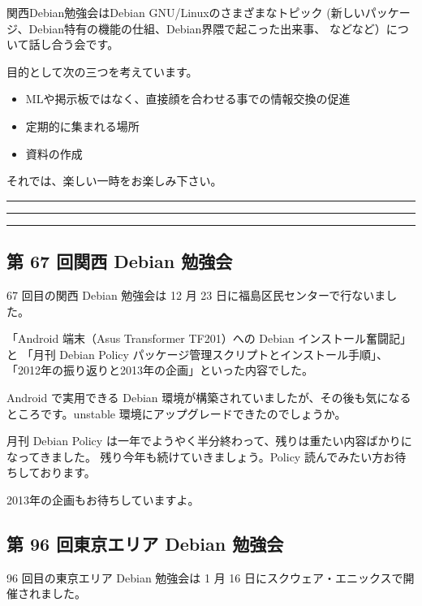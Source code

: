 \documentclass[mingoth,a4paper]{jsarticle}
\begin{document}
 関西Debian勉強会はDebian GNU/Linuxのさまざまなトピック
 (新しいパッケージ、Debian特有の機能の仕組、Debian界隈で起こった出来事、
 などなど）について話し合う会です。

 目的として次の三つを考えています。
 \begin{itemize}
  \item MLや掲示板ではなく、直接顔を合わせる事での情報交換の促進
  \item 定期的に集まれる場所
  \item 資料の作成
 \end{itemize}

 それでは、楽しい一時をお楽しみ下さい。

\newpage

\begin{minipage}[b]{0.2\hsize}
 {}
\end{minipage}
\begin{minipage}[b]{0.8\hsize}
\hrule
\vspace{2mm}
\hrule
\setcounter{tocdepth}{1}
\tableofcontents
\vspace{2mm}
\hrule
\end{minipage}


\subsection{第 67 回関西 Debian 勉強会}

67 回目の関西 Debian 勉強会は 12 月 23 日に福島区民センターで行ないました。

「Android 端末（Asus Transformer TF201）への Debian インストール奮闘記」と
「月刊 Debian Policy パッケージ管理スクリプトとインストール手順」、「2012年の振り返りと2013年の企画」といった内容でした。

Android で実用できる Debian 環境が構築されていましたが、その後も気になるところです。unstable 環境にアップグレードできたのでしょうか。

月刊 Debian Policy は一年でようやく半分終わって、残りは重たい内容ばかりになってきました。
残り今年も続けていきましょう。Policy 読んでみたい方お待ちしております。

2013年の企画もお待ちしていますよ。


\subsection{第 96 回東京エリア Debian 勉強会}
96 回目の東京エリア Debian 勉強会は 1 月 16 日にスクウェア・エニックスで開催されました。
\end{document}
